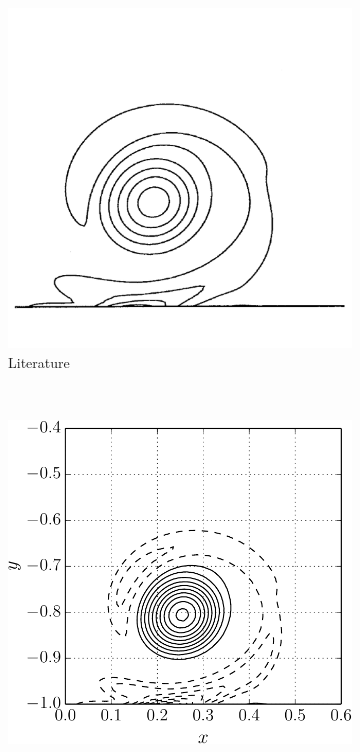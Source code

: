 	\begin{figure}[p]
     \centering
     \begin{subfigure}[t]{0.4\textwidth}
             \includegraphics[width=\textwidth]{figures/eulerian/VorticityContourPlot-rotated270.pdf}
             \caption{Literature}
             \label{fig:VorticityContourPlot}
     \end{subfigure}%
     ~ %
     \begin{subfigure}[t]{0.5\textwidth}
             \includegraphics[width=\textwidth]{figures/eulerian/dipole_contourLine_t1p0-crop.pdf}

\end{subfigure}
\end{figure}
